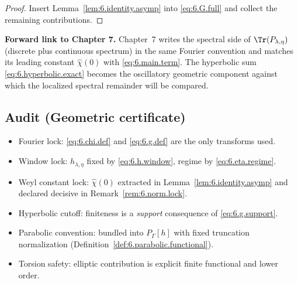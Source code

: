 \begin{proof}
Insert Lemma~\ref{lem:6.identity.asymp} into \eqref{eq:6.G.full} and collect the remaining contributions.
\end{proof}

\medskip
\noindent\textbf{Forward link to Chapter 7.}
Chapter~7 writes the spectral side of $\Tr(P_{\lambda,\eta})$ (discrete plus continuous spectrum) in the same Fourier
convention and matches its leading constant $\widehat\chi(0)$ with \eqref{eq:6.main.term}. The hyperbolic sum
\eqref{eq:6.hyperbolic.exact} becomes the oscillatory geometric component against which the localized spectral
remainder will be compared.

\subsection*{Audit (Geometric certificate)}\label{audit:ch6}
\begin{itemize}
\item[(G1)] Fourier lock: \eqref{eq:6.chi.def} and \eqref{eq:6.g.def} are the only transforms used.
\item[(G2)] Window lock: $h_{\lambda,\eta}$ fixed by \eqref{eq:6.h.window}, regime by \eqref{eq:6.eta.regime}.
\item[(G3)] Weyl constant lock: $\widehat\chi(0)$ extracted in Lemma~\ref{lem:6.identity.asymp} and declared decisive in
Remark~\ref{rem:6.norm.lock}.
\item[(G4)] Hyperbolic cutoff: finiteness is a \emph{support} consequence of \eqref{eq:6.g.support}.
\item[(G5)] Parabolic convention: bundled into $P_\Gamma[h]$ with fixed truncation normalization (Definition~\ref{def:6.parabolic.functional}).
\item[(G6)] Torsion safety: elliptic contribution is explicit finite functional and lower order.
\end{itemize}

